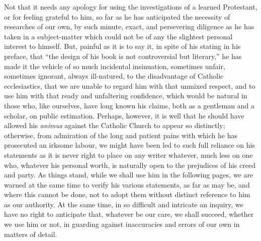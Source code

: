 Not that it needs any apology for using the investigations of a
learned Protestant, or for feeling grateful to him, so far as he has
anticipated the necessity of researches of our own, by such minute,
exact, and persevering diligence as he has taken in a subject-matter
which could not be of any the slightest personal interest to himself.
But, painful as it is to say it, in spite of his stating in his
preface, that ``the design of his book is not controversial but
literary,'' he has made it the vehicle of so much incidental
insinuation, sometimes unfair, sometimes ignorant, always ill-natured,
to the disadvantage of Catholic ecclesiastics, that we are unable to
regard him with that unmixed respect, and to use him with that
ready and unfaltering confidence, which would be natural in those who,
like ourselves, have long known his claims, both as a gentleman and a
scholar, on public estimation. Perhaps, however, it is well that he
should have allowed his \emph{animus} against the Catholic Church to
appear so distinctly; otherwise, from admiration of the long and
patient pains with which he has prosecuted an irksome labour, we might
have been led to such full reliance on his statements as it is never
right to place on any writer whatever, much less on one who, whatever
his personal worth, is naturally open to the prejudices of his creed
and party. As things stand, while we shall use him in the following
pages, we are warned at the same time to verify his various
statements, as far as may be, and where this cannot be done, not to
adopt them without distinct reference to him as our authority. At the
same time, in so difficult and intricate an inquiry, we have no right
to anticipate that, whatever be our care, we shall succeed, whether we
use him or not, in guarding against inaccuracies and errors of our own
in matters of detail.


